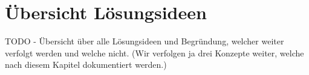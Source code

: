 \section{Übersicht Lösungsideen}
TODO - Übersicht über alle Lösungsideen und Begründung, welcher weiter verfolgt werden und welche nicht. (Wir verfolgen ja drei Konzepte weiter, welche nach diesem Kapitel dokumentiert werden.)